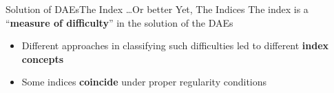 \begin{frame}{Solution of \aclp{DAE}}{The Index \dots Or better Yet, The Indices}
  The index is a ``\textbf{measure of difficulty}'' in the solution of the \acsp{DAE}
  \begin{itemize}
    \item Different approaches in classifying such difficulties led to different \textbf{index concepts} \\
    \item \raggedright Some indices \textbf{coincide} under proper regularity conditions
  \end{itemize}
  \vspace{0.25em}
  \vspace{0.25em}
  \scriptsize{}
\end{frame}

